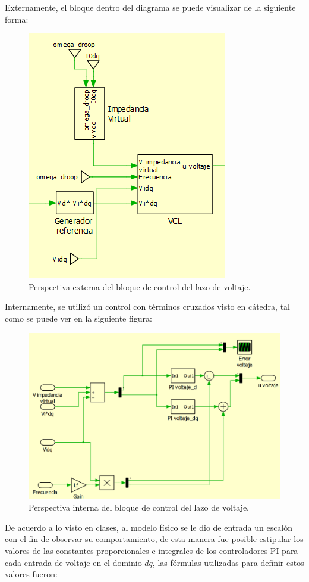 Externamente, el bloque dentro del diagrama se puede visualizar de la siguiente forma:

\begin{figure}
   \centering
   \includegraphics[width=0.5\linewidth]{Tarea 1/report/imagenes/p1d/vcl bloque externo.png}
   \caption{Perspectiva externa del bloque de control del lazo de voltaje.}
   \label{vcl externo}
\end{figure}

Internamente, se utilizó un control con términos cruzados visto en cátedra, tal como se puede ver en la siguiente figura:

\begin{figure}
   \centering
   \includegraphics[width=0.5\linewidth]{Tarea 1/report/imagenes/p1d/vcl bloque interno.png}
   \caption{Perspectiva interna del bloque de control del lazo de voltaje.}
   \label{vcl interno}
\end{figure}

De acuerdo a lo visto en clases, al modelo físico se le dio de entrada un escalón con el fin de observar su comportamiento, de esta manera fue posible estipular los valores de las constantes proporcionales e integrales de los controladores PI para cada entrada de voltaje en el dominio $dq$, las fórmulas utilizadas para definir estos valores fueron:

